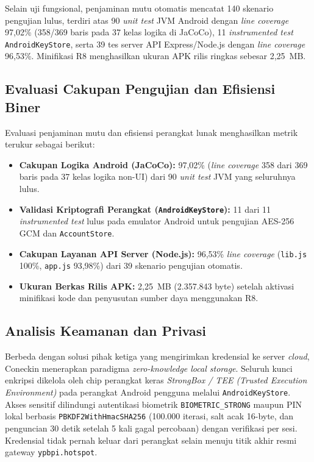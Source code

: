 \documentclass[10pt,journal,compsoc]{IEEEtran}
\begin{document}
Selain uji fungsional, penjaminan mutu otomatis mencatat 140 skenario pengujian lulus, terdiri atas 90 \textit{unit test} JVM Android dengan \textit{line coverage} 97,02\% (358/369 baris pada 37 kelas logika di JaCoCo), 11 \textit{instrumented test} \texttt{AndroidKeyStore}, serta 39 tes server API Express/Node.js dengan \textit{line coverage} 96,53\%. Minifikasi R8 menghasilkan ukuran APK rilis ringkas sebesar 2,25~MB.

\subsection{Evaluasi Cakupan Pengujian dan Efisiensi Biner}
Evaluasi penjaminan mutu dan efisiensi perangkat lunak menghasilkan metrik terukur sebagai berikut:
\begin{itemize}
    \item \textbf{Cakupan Logika Android (JaCoCo):} 97,02\% (\textit{line coverage} 358 dari 369 baris pada 37 kelas logika non-UI) dari 90 \textit{unit test} JVM yang seluruhnya lulus.
    \item \textbf{Validasi Kriptografi Perangkat (\texttt{AndroidKeyStore}):} 11 dari 11 \textit{instrumented test} lulus pada emulator Android untuk pengujian AES-256 GCM dan \texttt{AccountStore}.
    \item \textbf{Cakupan Layanan API Server (Node.js):} 96,53\% \textit{line coverage} (\texttt{lib.js} 100\%, \texttt{app.js} 93,98\%) dari 39 skenario pengujian otomatis.
    \item \textbf{Ukuran Berkas Rilis APK:} 2,25~MB (2.357.843 byte) setelah aktivasi minifikasi kode dan penyusutan sumber daya menggunakan R8.
\end{itemize}

\subsection{Analisis Keamanan dan Privasi}
Berbeda dengan solusi pihak ketiga yang mengirimkan kredensial ke server \textit{cloud}, Coneckin menerapkan paradigma \textit{zero-knowledge local storage}. Seluruh kunci enkripsi dikelola oleh chip perangkat keras \textit{StrongBox / TEE (Trusted Execution Environment)} pada perangkat Android pengguna melalui \texttt{AndroidKeyStore}. Akses sensitif dilindungi autentikasi biometrik \texttt{BIOMETRIC\_STRONG} maupun PIN lokal berbasis \texttt{PBKDF2WithHmacSHA256} (100.000 iterasi, salt acak 16-byte, dan penguncian 30 detik setelah 5 kali gagal percobaan) dengan verifikasi per sesi. Kredensial tidak pernah keluar dari perangkat selain menuju titik akhir resmi gateway \texttt{ypbpi.hotspot}.
\end{document}

